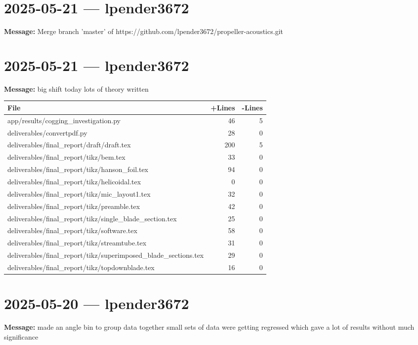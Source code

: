 \documentclass{article}
\begin{document}
\section*{2025-05-21 --- lpender3672}
\textbf{Message:} Merge branch 'master' of https://github.com/lpender3672/propeller-acoustics.git

\section*{2025-05-21 --- lpender3672}
\textbf{Message:} big shift today lots of theory written

\begin{longtable}{|p{10cm}|r|r|}
\hline \textbf{File} & \textbf{+Lines} & \textbf{-Lines} \\
\hline
app/results/cogging\_investigation.py & 46 & 5 \\
\hline
deliverables/convertpdf.py & 28 & 0 \\
\hline
deliverables/final\_report/draft/draft.tex & 200 & 5 \\
\hline
deliverables/final\_report/tikz/bem.tex & 33 & 0 \\
\hline
deliverables/final\_report/tikz/hanson\_foil.tex & 94 & 0 \\
\hline
deliverables/final\_report/tikz/helicoidal.tex & 0 & 0 \\
\hline
deliverables/final\_report/tikz/mic\_layout1.tex & 32 & 0 \\
\hline
deliverables/final\_report/tikz/preamble.tex & 42 & 0 \\
\hline
deliverables/final\_report/tikz/single\_blade\_section.tex & 25 & 0 \\
\hline
deliverables/final\_report/tikz/software.tex & 58 & 0 \\
\hline
deliverables/final\_report/tikz/streamtube.tex & 31 & 0 \\
\hline
deliverables/final\_report/tikz/superimposed\_blade\_sections.tex & 29 & 0 \\
\hline
deliverables/final\_report/tikz/topdownblade.tex & 16 & 0 \\
\hline
\end{longtable}

\section*{2025-05-20 --- lpender3672}
\textbf{Message:} made an angle bin to group data together small sets of data were getting regressed which gave a lot of results without much significance
\end{document}
